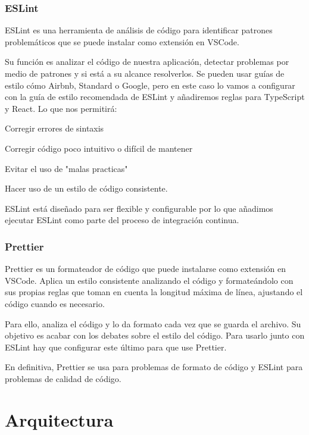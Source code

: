 \documentclass[12pt,twoside,titlepage]{report}
\begin{document}
\subsubsection{ESLint}

ESLint es una herramienta de análisis de código para identificar patrones problemáticos que se puede instalar como extensión en VSCode.

Su función es analizar el código de nuestra aplicación, detectar problemas por medio de patrones y si está a su alcance resolverlos. Se pueden usar guías de estilo cómo Airbnb, Standard o Google, pero en este caso lo vamos a configurar con la guía de estilo recomendada de ESLint y añadiremos reglas para TypeScript y React. Lo que nos permitirá:

\begin{compactitem}
 \item Corregir errores de sintaxis
 \item Corregir código poco intuitivo o difícil de mantener
 \item Evitar el uso de "malas practicas"
 \item Hacer uso de un estilo de código consistente.
\end{compactitem}

ESLint está diseñado para ser flexible y configurable por lo que añadimos ejecutar ESLint como parte del proceso de integración continua.

\subsubsection{Prettier}

Prettier es un formateador de código que puede instalarse como extensión en VSCode. Aplica un estilo consistente analizando el código y formateándolo con sus propias reglas que toman en cuenta la longitud máxima de línea, ajustando el código cuando es necesario.

Para ello, analiza el código y lo da formato cada vez que se guarda el archivo. Su objetivo es acabar con los debates sobre el estilo del código. Para usarlo junto con ESLint hay que configurar este último para que use Prettier.

En definitiva, Prettier se usa para problemas de formato de código y ESLint para problemas de calidad de código.

\section{Arquitectura}
\end{document}
